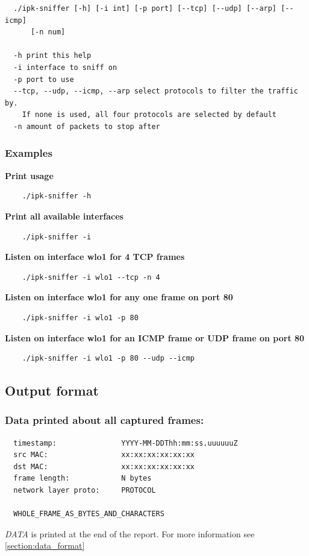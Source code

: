 \documentclass[a4paper]{article}
\begin{document}
  \begin{verbatim}
  ./ipk-sniffer [-h] [-i int] [-p port] [--tcp] [--udp] [--arp] [--icmp] 
      [-n num]

  -h print this help
  -i interface to sniff on
  -p port to use
  --tcp, --udp, --icmp, --arp select protocols to filter the traffic by.
    If none is used, all four protocols are selected by default
  -n amount of packets to stop after
  \end{verbatim}


  \subsubsection{Examples}

  \noindent
  \textbf{Print usage}
  \begin{verbatim}
    ./ipk-sniffer -h
  \end{verbatim}

  \noindent
  \textbf{Print all available interfaces}
  \begin{verbatim}
    ./ipk-sniffer -i
  \end{verbatim}

  \noindent
  \textbf{Listen on interface wlo1 for 4 TCP frames}
  \begin{verbatim}
    ./ipk-sniffer -i wlo1 --tcp -n 4
  \end{verbatim}

  \noindent
  \textbf{Listen on interface wlo1 for any one frame on port 80}
  \begin{verbatim}
    ./ipk-sniffer -i wlo1 -p 80
  \end{verbatim}

  \noindent
  \textbf{Listen on interface wlo1 for an ICMP frame or  UDP frame on port 80}
  \begin{verbatim}
    ./ipk-sniffer -i wlo1 -p 80 --udp --icmp
  \end{verbatim}


  \subsection{Output format}

  \subsubsection{Data printed about all captured frames:}
    
  \begin{verbatim}
  timestamp:               YYYY-MM-DDThh:mm:ss.uuuuuuZ
  src MAC:                 xx:xx:xx:xx:xx:xx
  dst MAC:                 xx:xx:xx:xx:xx:xx
  frame length:            N bytes
  network layer proto:     PROTOCOL

  WHOLE_FRAME_AS_BYTES_AND_CHARACTERS
  \end{verbatim}
  \begin{notes}
    \item \textit{DATA} is printed at the end of the report. For more 
      information see \ref{section:data_format}
  \end{notes}
\end{document}
